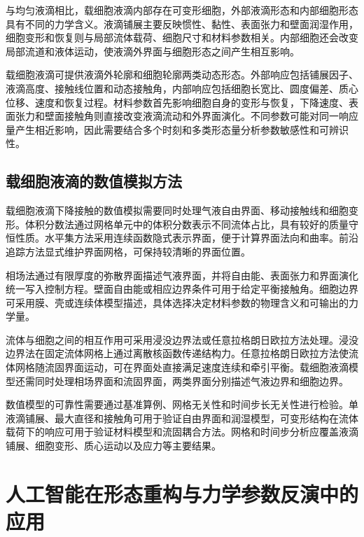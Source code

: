 与均匀液滴相比，载细胞液滴内部存在可变形细胞，外部液滴形态和内部细胞形态具有不同的力学含义。液滴铺展主要反映惯性、黏性、表面张力和壁面润湿作用，细胞变形和恢复则与局部流体载荷、细胞尺寸和材料参数相关。内部细胞还会改变局部流道和液体运动，使液滴外界面与细胞形态之间产生相互影响\cite{blanken2021compoundperspective,freund2014bloodcells}。

载细胞液滴可提供液滴外轮廓和细胞轮廓两类动态形态。外部响应包括铺展因子、液滴高度、接触线位置和动态接触角，内部响应包括细胞长宽比、圆度偏差、质心位移、速度和恢复过程。材料参数首先影响细胞自身的变形与恢复，下降速度、表面张力和壁面接触角则直接改变液滴流动和外界面演化。不同参数可能对同一响应量产生相近影响，因此需要结合多个时刻和多类形态量分析参数敏感性和可辨识性\cite{raue2009identifiability}。

\subsection{载细胞液滴的数值模拟方法}

载细胞液滴下降接触的数值模拟需要同时处理气液自由界面、移动接触线和细胞变形。体积分数法通过网格单元中的体积分数表示不同流体占比，具有较好的质量守恒性质\cite{hirt1981vof}。水平集方法采用连续函数隐式表示界面，便于计算界面法向和曲率\cite{osher1988fronts,sussman1994levelset}。前沿追踪方法显式维护界面网格，可保持较清晰的界面位置\cite{unverdi1992fronttracking}。

相场法通过有限厚度的弥散界面描述气液界面，并将自由能、表面张力和界面演化统一写入控制方程\cite{anderson1998diffuseinterface,jacqmin1999phasefield,badalassi2003phasefield,yue2004diffuseinterface}。壁面自由能或相应边界条件可用于给定平衡接触角。细胞边界可采用膜、壳或连续体模型描述，具体选择决定材料参数的物理含义和可输出的力学量\cite{freund2014bloodcells,barthesbiesel2016motion}。

流体与细胞之间的相互作用可采用浸没边界法或任意拉格朗日欧拉方法处理。浸没边界法在固定流体网格上通过离散核函数传递结构力\cite{peskin2002immersed}。任意拉格朗日欧拉方法使流体网格随流固界面运动，可在界面处直接满足速度连续和牵引平衡\cite{donea2004ale}。载细胞液滴模型还需同时处理相场界面和流固界面，两类界面分别描述气液边界和细胞边界。

数值模型的可靠性需要通过基准算例、网格无关性和时间步长无关性进行检验。单液滴铺展、最大直径和接触角可用于验证自由界面和润湿模型，可变形结构在流体载荷下的响应可用于验证材料模型和流固耦合方法。网格和时间步分析应覆盖液滴铺展、细胞变形、质心运动以及应力等主要结果\cite{roache1998verification}。

\section{人工智能在形态重构与力学参数反演中的应用}

